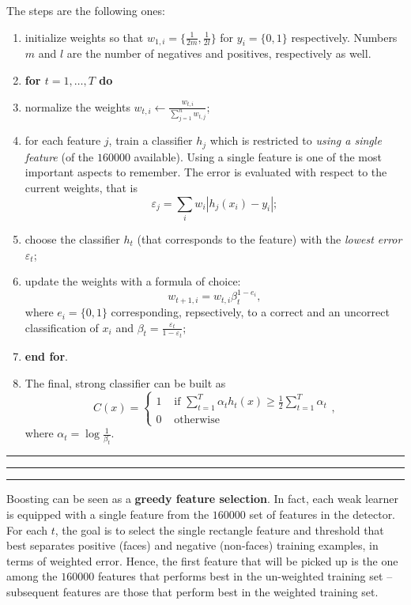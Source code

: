 \documentclass[10pt]{report}
\begin{document}
The steps are the following ones:
\begin{enumerate}
\item initialize weights so that \(w_{1,i} = \{\frac{1}{2m},\frac{1}{2l}\}\) for \(y_i = \{0, 1\}\) respectively. Numbers \(m\) and \(l\) are the number of negatives and positives, respectively as well.
\item \textbf{for \(t = 1,\dots,T\) do}
\item normalize the weights \(w_{t,i} \leftarrow \frac{w_{t,i}}{\sum_{j=1}^n w_{t,j}}\);
\item for each feature \(j\), train a classifier \(h_j\) which is restricted to \emph{using a single feature} (of the \(160000\) available). Using a single feature is one of the most important aspects to remember. The error is evaluated with respect to the current weights, that is $$\varepsilon_j = \sum_{i} w_i|h_j(x_i) - y_i|;$$
\item choose the classifier \(h_t\) (that corresponds to the feature) with the \emph{lowest error} \(\varepsilon_t\);
\item update the weights with a formula of choice: $$w_{t+1,i} = w_{t,i}\beta_{t}^{1-e_i},$$ where \(e_i = \{0, 1\}\) corresponding, repsectively, to a correct and an uncorrect classification of \(x_i\) and \(\beta_t = \frac{\varepsilon_t}{1 - \varepsilon_t};\)
\item \textbf{end for}.
\item The final, strong classifier can be built as $$C(x) = \left\{\begin{array}{ll} 1 & \mbox{ if } \displaystyle \sum_{t=1}^T\alpha_t h_t(x) \geq \frac 1 2 \sum_{t=1}^T \alpha_t \\ 0 & \mbox{ otherwise } \end{array}\right. ,$$ where \(\alpha_t = \log{\frac 1 {\beta_t}}\).
\end{enumerate}
\vspace*{0.6cm}\hrule
\hrule
\hrule
\vspace*{0.4cm}

Boosting can be seen as a \textbf{greedy feature selection}. In fact, each weak learner is equipped with a single feature from the \(160000\) set of features in the detector. For each \(t\), the goal is to select the single rectangle feature and threshold that best separates positive (faces) and negative (non\--faces) training examples, in terms of weighted error. Hence, the first feature that will be picked up is the one among the \(160000\) features that performs best in the un\--weighted training set -- subsequent features are those that perform best in the weighted training set.
\end{document}
